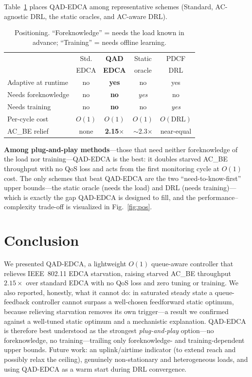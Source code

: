 \documentclass[conference]{IEEEtran}
\newcommand{\AC}[1]{AC\_#1}
\begin{document}
Table~\ref{tab:sota} places QAD-EDCA among representative schemes
(Standard, AC-agnostic DRL, the static oracles, and AC-aware DRL).

\begin{table}[t]
\centering
\caption{Positioning. ``Foreknowledge'' = needs the load known in advance;
``Training'' = needs offline learning.}
\label{tab:sota}
\setlength{\tabcolsep}{3.5pt}
\begin{tabular}{@{}lcccc@{}}
\toprule
 & Std. & \textbf{QAD} & Static & PDCF\\
 & EDCA & \textbf{EDCA} & oracle & DRL\\
\midrule
Adaptive at runtime & no & \textbf{yes} & no & yes\\
Needs foreknowledge & no & \textbf{no} & \emph{yes} & no\\
Needs training      & no & \textbf{no} & no & \emph{yes}\\
Per-cycle cost      & $O(1)$ & \textbf{$O(1)$} & $O(1)$ & $O(\text{DRL})$\\
\AC{BE} relief      & none & \textbf{2.15$\times$} & $\sim$2.3$\times$ & near-equal\\
\bottomrule
\end{tabular}
\end{table}

\textbf{Among plug-and-play methods}---those that need neither foreknowledge of
the load nor training---QAD-EDCA is the best: it doubles starved \AC{BE}
throughput with no QoS loss and acts from the first monitoring cycle at $O(1)$
cost. The only schemes that beat QAD-EDCA are the two ``need-to-know-first''
upper bounds---the static oracle (needs the load) and DRL (needs training)---which
is exactly the gap QAD-EDCA is designed to fill, and the performance--complexity
trade-off is visualized in Fig.~\ref{fig:pos}.

\section{Conclusion}
We presented QAD-EDCA, a lightweight $O(1)$ queue-aware controller that
relieves IEEE~802.11 EDCA starvation, raising starved \AC{BE} throughput
$2.15\times$ over standard EDCA with no QoS loss and zero tuning or training.
We also reported, honestly, what it cannot do: in saturated steady state a
queue-feedback controller cannot surpass a well-chosen feedforward static
optimum, because relieving starvation removes its own trigger---a result we
confirmed against a well-tuned static optimum and a mechanistic explanation.
QAD-EDCA is therefore best understood as the strongest
\emph{plug-and-play} option---no foreknowledge, no training---trailing only
foreknowledge- and training-dependent upper bounds. Future work: an
uplink/airtime indicator (to extend reach
and possibly relax the ceiling), genuinely non-stationary and heterogeneous
loads, and using QAD-EDCA as a warm start during DRL convergence.
\end{document}
